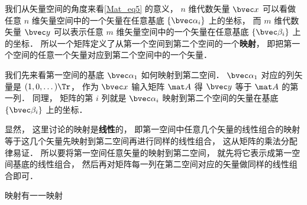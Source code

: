 
我们从矢量空间的角度来看\autoref{Mat_eq5} 的意义， $n$ 维代数矢量 $\bvec x$ 可以看做任意 $n$ 维矢量空间中的一个矢量在任意基底 $\{\bvec \alpha_i\}$ 上的坐标， 而 $m$ 维代数矢量 $\bvec y$ 可以表示任意 $m$ 维矢量空间中的一个矢量在任意基底 $\{\bvec \beta_i\}$ 上的坐标． 所以一个矩阵定义了从第一个空间到第二个空间的一个\textbf{映射}， 即把第一个空间的任意一个矢量对应到第二个空间中的一个矢量． 

我们先来看第一空间的基底 $\bvec \alpha_1$ 如何映射到第二空间． $\bvec\alpha_1$ 对应的列矢量是 $(1, 0, \dots)\Tr$， 作为 $\bvec x$ 输入矩阵 $\mat A$ 得 $\bvec y$ 等于 $\mat A$ 的第一列． 同理， 矩阵的第 $i$ 列就是 $\bvec\alpha_i$ 映射到第二个空间的矢量在基底 $\{\bvec \beta_i\}$ 上的坐标．

显然， 这里讨论的映射是\textbf{线性}的， 即第一空间中任意几个矢量的线性组合的映射等于这几个矢量先映射到第二空间再进行同样的线性组合， 这从矩阵的乘法分配律易证． 所以要将第一空间任意矢量的映射到第二空间， 就先将它表示成第一空间基底的线性组合， 然后再对矩阵每一列在第二空间对应的矢量做同样的线性组合即可．

映射有一一映射

